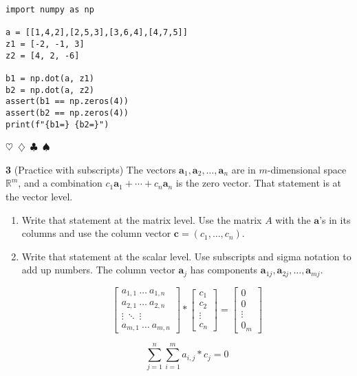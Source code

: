 \documentclass{article}
\newcommand{\sep}{\begin{center}$\heartsuit$~$\diamondsuit$~$\clubsuit$~$\spadesuit$\end{center}}
\newcommand{\vect}[1]{\ensuremath{\boldsymbol{#1}}}
\begin{document}
\begin{verbatim}
import numpy as np

a = [[1,4,2],[2,5,3],[3,6,4],[4,7,5]]
z1 = [-2, -1, 3]
z2 = [4, 2, -6]

b1 = np.dot(a, z1)
b2 = np.dot(a, z2)
assert(b1 == np.zeros(4))
assert(b2 == np.zeros(4))
print(f"{b1=} {b2=}")
\end{verbatim}

\sep

\noindent\textbf{3} (Practice with subscripts) The vectors $\vect{a}_1, \vect{a}_2, \ldots , \vect{a}_n$ are in $m$-dimensional space $\mathbb{R}^m$, and a combination $c_1\vect{a}_1 + \cdots + c_n\vect{a}_n$ is the zero vector. That statement is at the vector level. 
\begin{enumerate}
\item Write that statement at the matrix level. Use the matrix $A$ with the $\vect{a}$'s in its columns and use the column vector $\vect{c} = (c_1, \ldots, c_n)$.
\item Write that statement at the scalar level. Use subscripts and sigma notation to add up numbers. The column vector $\vect{a}_j$ has components $\vect{a}_{1j}, \vect{a}_{2j}, \ldots, \vect{a}_{mj}$.

\begin{displaymath}
  \begin{bmatrix}
    a_{1,1} ~ \ldots ~ a_{1,n} \\
    a_{2,1} ~ \ldots ~ a_{2,n} \\
    \vdots ~ \ddots ~ \vdots \\
    a_{m,1} ~ \ldots ~ a_{m,n}
  \end{bmatrix}
  * \begin{bmatrix} c_1 \\ c_2 \\ \vdots \\ c_n \end{bmatrix}
  = \begin{bmatrix} 0 \\ 0 \\ \vdots \\ 0_m \end{bmatrix}
\end{displaymath}

\begin{displaymath}
\sum_{j=1}^{n} \sum_{i=1}^{m} a_{i,j} * c_j = 0
\end{displaymath}

\end{enumerate}
\end{document}
